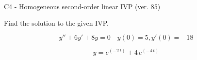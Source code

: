 \begin{exercise}
  \begin{exerciseTitle}C4 - Homogeneous second-order linear IVP (ver. 85)\end{exerciseTitle}
  \begin{exerciseStatement}
    
Find the solution to the given IVP.

    
\[y''+6y'+8y = 0 \hspace{1em} y(0) = 5 , y'(0) = -18\]

  \end{exerciseStatement}
  \begin{exerciseAnswer}
    
\[y= e^{\left(-2 \, t\right)} + 4 \, e^{\left(-4 \, t\right)}\]

  \end{exerciseAnswer}
\end{exercise}